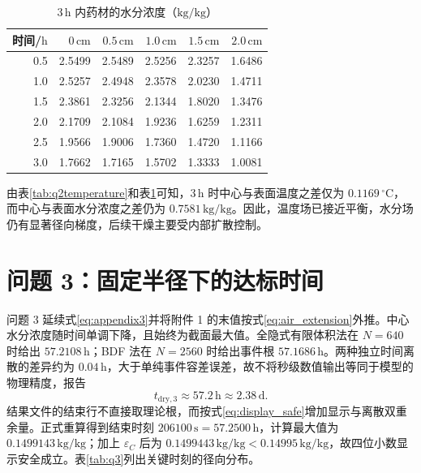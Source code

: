 \documentclass[UTF8,a4paper,zihao=-4,fontset=fandol]{ctexart}
\newcommand{\unit}[1]{\,\mathrm{#1}}
\begin{document}
\begin{table}[H]
\centering
\caption{$3\unit{h}$ 内药材的水分浓度（$\mathrm{kg/kg}$）}
\label{tab:q2moisture}
\small
\begin{tabular}{rrrrrr}
\toprule
时间/$\mathrm{h}$ & $0\unit{cm}$ & $0.5\unit{cm}$ & $1.0\unit{cm}$ & $1.5\unit{cm}$ & $2.0\unit{cm}$ \\
\midrule
0.5 & 2.5499 & 2.5489 & 2.5256 & 2.3257 & 1.6486 \\
1.0 & 2.5257 & 2.4948 & 2.3578 & 2.0230 & 1.4711 \\
1.5 & 2.3861 & 2.3256 & 2.1344 & 1.8020 & 1.3476 \\
2.0 & 2.1709 & 2.1084 & 1.9236 & 1.6259 & 1.2311 \\
2.5 & 1.9566 & 1.9006 & 1.7360 & 1.4720 & 1.1166 \\
3.0 & 1.7662 & 1.7165 & 1.5702 & 1.3333 & 1.0081 \\
\bottomrule
\end{tabular}
\end{table}

由表\ref{tab:q2temperature}和表\ref{tab:q2moisture}可知，$3\unit{h}$ 时中心与表面温度之差仅为 $0.1169\,^{\circ}\mathrm{C}$，而中心与表面水分浓度之差仍为 $0.7581\unit{kg/kg}$。因此，温度场已接近平衡，水分场仍有显著径向梯度，后续干燥主要受内部扩散控制。

\section{问题 3：固定半径下的达标时间}

问题 3 延续式\eqref{eq:appendix3}并将附件 1 的末值按式\eqref{eq:air_extension}外推。中心水分浓度随时间单调下降，且始终为截面最大值。全隐式有限体积法在 $N=640$ 时给出 $57.2108\unit{h}$；BDF 法在 $N=2560$ 时给出事件根 $57.1686\unit{h}$。两种独立时间离散的差异约为 $0.04\unit{h}$，大于单纯事件容差误差，故不将秒级数值输出等同于模型的物理精度，报告
\begin{equation}
t_{\mathrm{dry},3}\approx57.2\unit{h}\approx2.38\unit{d}.
\end{equation}
结果文件的结束行不直接取理论根，而按式\eqref{eq:display_safe}增加显示与离散双重余量。正式重算得到结束时刻 $206100\unit{s}=57.2500\unit{h}$，计算最大值为 $0.1499143\unit{kg/kg}$；加上 $\varepsilon_C$ 后为 $0.1499443\unit{kg/kg}<0.14995\unit{kg/kg}$，故四位小数显示安全成立。表\ref{tab:q3}列出关键时刻的径向分布。
\end{document}
